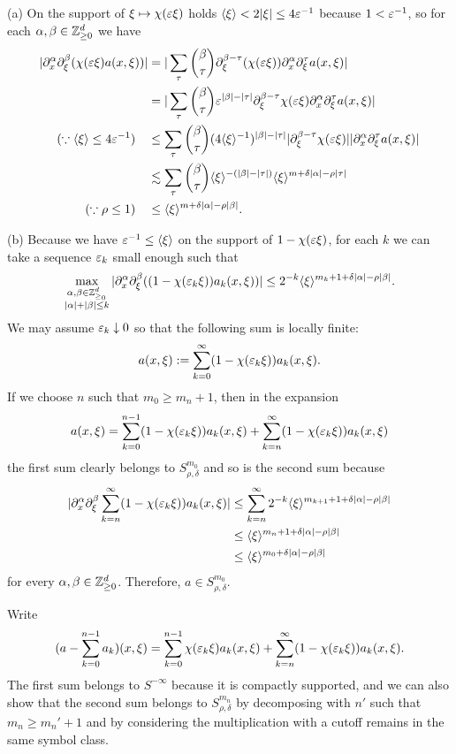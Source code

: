 \documentclass{../../large}
\begin{document}
\begin{pf}
(a)
On the support of $\xi\mapsto\chi(\varepsilon\xi)$ holds $\langle\xi\rangle<2|\xi|\le4\varepsilon^{-1}$ because $1<\varepsilon^{-1}$, so for each $\alpha,\beta\in\mathbb{Z}_{\ge0}^d$ we have
\begin{align*}
|\partial_x^\alpha\partial_\xi^\beta(\chi(\varepsilon\xi)a(x,\xi))|
&=|\sum_\tau{\beta\choose\tau}\partial_\xi^{\beta-\tau}(\chi(\varepsilon\xi))\partial_x^\alpha\partial_\xi^\tau a(x,\xi)|\\
&=|\sum_\tau{\beta\choose\tau}\varepsilon^{|\beta|-|\tau|}\partial_\xi^{\beta-\tau}\chi(\varepsilon\xi)\partial_x^\alpha\partial_\xi^\tau a(x,\xi)|\\
(\because\langle\xi\rangle\le4\varepsilon^{-1})\quad
&\le\sum_\tau{\beta\choose\tau}(4\langle\xi\rangle^{-1})^{|\beta|-|\tau|}|\partial_\xi^{\beta-\tau}\chi(\varepsilon\xi)||\partial_x^\alpha\partial_\xi^\tau a(x,\xi)|\\
&\lesssim\sum_{\tau}{\beta\choose\tau}\langle\xi\rangle^{-(|\beta|-|\tau|)}\langle\xi\rangle^{m+\delta|\alpha|-\rho|\tau|}\\
(\because\rho\le1)\quad
&\le\langle\xi\rangle^{m+\delta|\alpha|-\rho|\beta|}.
\end{align*}

(b)
Because we have $\varepsilon^{-1}\le\langle\xi\rangle$ on the support of $1-\chi(\varepsilon\xi)$, for each $k$ we can take a sequence $\varepsilon_k$ small enough such that
\[\max_{\substack{\alpha,\beta\in\mathbb{Z}_{\ge_0}^d\\|\alpha|+|\beta|\le k}}|\partial_x^\alpha\partial_\xi^\beta((1-\chi(\varepsilon_k\xi))a_k(x,\xi))|\le2^{-k}\langle\xi\rangle^{m_k+1+\delta|\alpha|-\rho|\beta|}.\]
We may assume $\varepsilon_k\downarrow0$ so that the following sum is locally finite:
\[a(x,\xi):=\sum_{k=0}^\infty(1-\chi(\varepsilon_k\xi))a_k(x,\xi).\]
If we choose $n$ such that $m_0\ge m_n+1$, then in the expansion
\[a(x,\xi)=\sum_{k=0}^{n-1}(1-\chi(\varepsilon_k\xi))a_k(x,\xi)+\sum_{k=n}^\infty(1-\chi(\varepsilon_k\xi))a_k(x,\xi)\]
the first sum clearly belongs to $S_{\rho,\delta}^{m_0}$ and so is the second sum because
\begin{align*}
|\partial_x^\alpha\partial_\xi^\beta\sum_{k=n}^\infty(1-\chi(\varepsilon_k\xi))a_k(x,\xi)|
&\le\sum_{k=n}^\infty2^{-k}\langle\xi\rangle^{m_{k+1}+1+\delta|\alpha|-\rho|\beta|}\\
&\le\langle\xi\rangle^{m_n+1+\delta|\alpha|-\rho|\beta|}\\
&\le\langle\xi\rangle^{m_0+\delta|\alpha|-\rho|\beta|}
\end{align*}
for every $\alpha,\beta\in\mathbb{Z}_{\ge0}^d$.
Therefore, $a\in S_{\rho,\delta}^{m_0}$.

Write
\[(a-\sum_{k=0}^{n-1}a_k)(x,\xi)=\sum_{k=0}^{n-1}\chi(\varepsilon_k\xi)a_k(x,\xi)+\sum_{k=n}^\infty(1-\chi(\varepsilon_k\xi))a_k(x,\xi).\]
The first sum belongs to $S^{-\infty}$ because it is compactly supported, and we can also show that the second sum belongs to $S_{\rho,\delta}^{m_n}$ by decomposing with $n'$ such that $m_n\ge m_n'+1$ and by considering the multiplication with a cutoff remains in the same symbol class.
\end{pf}
\end{document}
